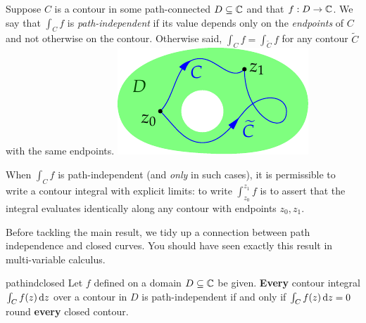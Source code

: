 \begin{defn}[lower separated=false, sidebyside, sidebyside align=top seam, sidebyside gap=0pt, righthand width=0.29\linewidth]{}{}
	Suppose $C$ is a contour in some path-connected $D\subseteq\mathbb{C}$ and that $f:D\to\mathbb{C}$. We say that $\int_Cf$ is \emph{path-independent} if its value depends only on the \emph{endpoints} of $C$ and not otherwise on the contour.\smallbreak
	Otherwise said, $\int_Cf=\int_{\widetilde C}f$ for any contour $\widetilde C$ with the same endpoints.
	\tcblower
	\flushright\includegraphics[scale=0.95]{ftc-5}
\end{defn}

	When $\int_C f$ is path-independent (and \emph{only} in such cases), it is permissible to write a contour integral with explicit limits: to write $\int_{z_0}^{z_1}f$ is to assert that the integral evaluates identically along any contour with endpoints $z_0,z_1$.\smallbreak

Before tackling the main result, we tidy up a connection between path independence and closed curves. You should have seen exactly this result in multi-variable calculus.

\begin{lemm}{}{pathindclosed}
	Let $f$ defined on a domain $D\subseteq\mathbb{C}$ be given. \textbf{Every} contour integral $\int_Cf(z)\,{\mathrm{d} z}$ over a contour in $D$ is path-independent if and only if $\int_Cf(z)\,{\mathrm{d} z}=0$ round \textbf{every} closed contour.
\end{lemm}

